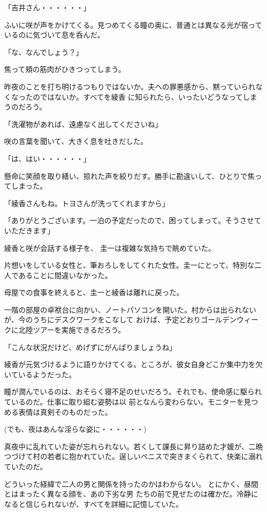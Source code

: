 ﻿\documentclass[book,tate]{jlreq}
\begin{document}
「吉井さん・・・・・・」

ふいに咲が声をかけてくる。見つめてくる瞳の奥に、普通とは異なる光が宿っているのに気づいて息を呑んだ。

「な、なんでしょう？」

焦って頬の筋肉がひきつってしまう。

昨夜のことを打ち明けるつもりではないか。夫への罪悪感から、黙っていられなくなったのではないか。すべてを綾香 に知られたら、いったいどうなってしまうのだろう。

「洗濯物があれば、遠慮なく出してくださいね」

咲の言葉を聞いて、大きく息を吐きだした。

「は、はい・・・・・・」

懸命に笑顔を取り繕い、掠れた声を絞りだす。勝手に勘違いして、ひとりで焦ってしまった。

「綾香さんもね。トヨさんが洗ってくれますから」

「ありがとうございます。一泊の予定だったので、困ってしまって。そうさせていただきます」

綾香と咲が会話する様子を、 圭一は複雑な気持ちで眺めていた。

片想いをしている女性と、筆おろしをしてくれた女性。圭一にとって、特別な二人であることに間違いなかった。

母屋での食事を終えると、圭一と綾香は離れに戻った。

一階の部屋の卓袱台に向かい、ノートパソコンを開いた。村からは出られないが、今のうちにデスクワークをこなして おけば、予定どおりゴールデンウィークに北陸ツアーを実施できるだろう。

「こんな状況だけど、めげずにがんばりましょうね」

綾香が元気づけるように語りかけてくる。ところが、彼女自身どこか集中力を欠いているようだった。

瞳が潤んでいるのは、おそらく寝不足のせいだろう。それでも、使命感に駆られているのだ。仕事に取り組む姿勢は以 前となんら変わらない。モニターを見つめる表情は真剣そのものだった。

(でも、夜はあんな淫らな姿に・・・・・・)

真夜中に乱れていた姿が忘れられない。若くして課長に昇り詰めた才媛が、二晩つづけて村の若者に抱かれていた。逞しいペニスで突きまくられて、快楽に溺れていたのだ。

どういった経緯で二人の男と関係を持ったのかはわからない。 とにかく、昼間とはまったく異なる顔を、あの下劣な男 たちの前で見せたのは確かだ。冷静になると信じられないが、すべてを詳細に記憶していた。
\end{document}
